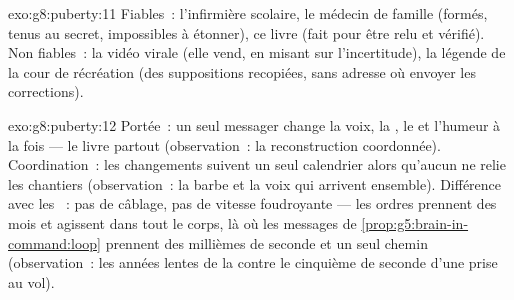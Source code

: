 \begin{solution}{exo:g8:puberty:11}
Fiables~: l'infirmière scolaire, le médecin de famille (formés,
tenus au secret, impossibles à étonner), ce livre (fait pour être
relu et vérifié). Non fiables~: la vidéo virale (elle vend, en
misant sur l'incertitude), la légende de la cour de récréation (des
suppositions recopiées, sans adresse où envoyer les corrections).
\end{solution}

\begin{solution}{exo:g8:puberty:12}
Portée~: un seul messager change la voix, la , le  et
l'humeur à la fois --- le  livre partout (observation~: la
reconstruction coordonnée). Coordination~: les changements suivent
un seul calendrier alors qu'aucun  ne relie les chantiers
(observation~: la barbe et la voix qui arrivent ensemble). Différence
avec les ~: pas de câblage, pas de vitesse foudroyante --- les
ordres prennent des mois et agissent dans tout le corps, là où les
messages de \cref{prop:g5:brain-in-command:loop} prennent des
millièmes de seconde et un seul chemin (observation~: les années
lentes de la  contre le cinquième de seconde d'une prise au
vol).
\end{solution}

